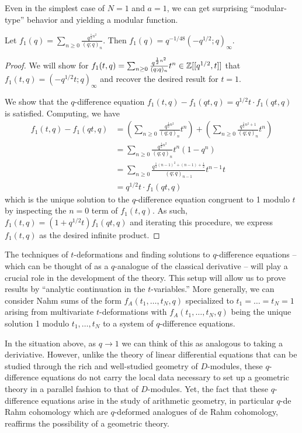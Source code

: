 Even in the simplest case of $N=1$ and $a=1$, we can get surprising ``modular-type'' behavior and yielding a modular function. 
\begin{proposition}\label{prop: modularity of a=1}
    Let $f_{1}(q)=\sum_{n\geq0}\frac{q^{\frac{1}{2}n^{2}}}{(q;q)_{n}}$. Then $f_{1}(q)=q^{-1/48}(-q^{1/2};q)_{\infty}$. 
\end{proposition}
\begin{proof}
    We will show for $f_{1}(t,q)=\sum_{n\geq0}\frac{q^{\frac{1}{2}n^{2}}}{(q;q)_{n}}t^{n}\in\mathbb{Z}[[q^{1/2},t]]$ that $f_{1}(t,q)=(-q^{1/2}t;q)_{\infty}$ and recover the desired result for $t=1$. 

    We show that the $q$-difference equation $f_{1}(t,q)-f_{1}(qt,q)=q^{1/2}t\cdot f_{1}(qt,q)$ is satisfied. Computing, we have
    \begin{align*}
        f_{1}(t,q) - f_{1}(qt,q) &= \left(\sum_{n\geq0}\frac{q^{\frac{1}{2}n^{2}}}{(q;q)_{n}}t^{n}\right) + \left(\sum_{n\geq0}\frac{q^{\frac{1}{2}n^{2}+1}}{(q;q)_{n}}t^{n}\right) \\
        &= \sum_{n\geq0}\frac{q^{\frac{1}{2}n^{2}}}{(q;q)_{n}}t^{n}(1-q^{n}) \\
        &= \sum_{n\geq0}\frac{q^{\frac{1}{2}(n-1)^{2}+(n-1)+\frac{1}{2}}}{(q;q)_{n-1}}t^{n-1}t \\
        &= q^{1/2}t\cdot f_{1}(qt,q)
    \end{align*}
    which is the unique solution to the $q$-difference equation congruent to 1 modulo $t$ by inspecting the $n=0$ term of $f_{1}(t,q)$. As such, $f_{1}(t,q)=(1+q^{1/2}t)f_{1}(qt,q)$ and iterating this procedure, we express $f_{1}(t,q)$ as the desired infinite product.
\end{proof}
The techniques of $t$-deformations and finding solutions to $q$-difference equations -- which can be thought of as a $q$-analogue of the classical derivative -- will play a crucial role in the development of the theory. This setup will allow us to prove results by ``analytic continuation in the $t$-variables.'' More generally, we can consider Nahm sums of the form $f_{A}(t_{1},\dots,t_{N},q)$ specialized to $t_{1}=\dots=t_{N}=1$ arising from multivariate $t$-deformations with $f_{A}(t_{1},\dots,t_{N},q)$ being the unique solution 1 modulo $t_{1},\dots,t_{N}$ to a system of $q$-difference equations.

In the situation above, as $q\to1$ we can think of this as analogous to taking a deriviative. However, unlike the theory of linear differential equations that can be studied through the rich and well-studied geometry of $D$-modules, these $q$-difference equations do not carry the local data necessary to set up a geometric theory in a parallel fashion to that of $D$-modules. Yet, the fact that these $q$-difference equations arise in the study of arithmetic geometry, in particular $q$-de Rahm cohomology which are $q$-deformed analogues of de Rahm cohomology, reaffirms the possibility of a geometric theory. 

